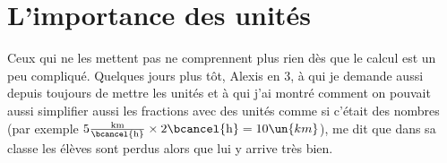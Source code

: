 
\section{L'importance des unités}
Ceux qui ne les mettent pas ne comprennent plus rien dès que le calcul est un peu compliqué. Quelques jours plus tôt, Alexis en 3\ieme{}, à qui je demande aussi depuis toujours de mettre les unités et à qui j'ai montré comment on pouvait aussi simplifier aussi les fractions avec des unités comme si c'était des nombres (par exemple $5 \frac{\mathrm{km}}{\bcancel{\mathrm{h}}} \times 2 \bcancel{\mathrm{h}}=10\un{km}$), me dit que dans sa classe les élèves sont perdus alors que lui y arrive très bien.

